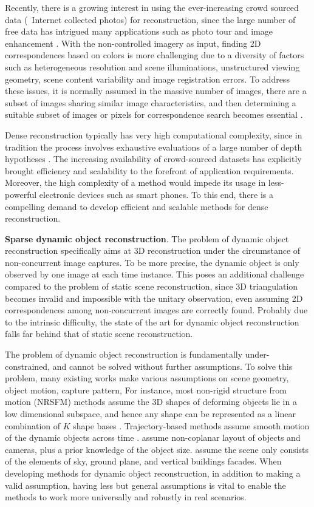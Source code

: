 Recently, there is a growing interest in using the ever-increasing crowd sourced data (\ie~Internet collected photos) for reconstruction, since the large number of free data has intrigued many applications such as photo tour \cite{Snavely2} and image enhancement \cite{zhang2014personal}. With the non-controlled imagery as input, finding 2D correspondences based on colors is more challenging due to a diversity of factors such as heterogeneous resolution and scene illuminations, unstructured viewing geometry, scene content variability and image registration errors. To address these issues, it is normally assumed in the massive number of images, there are a subset of images sharing similar image characteristics, and then 
determining a suitable subset of images or pixels for correspondence search becomes essential \cite{Goesele07}.

Dense reconstruction typically has very high computational complexity, since in tradition the process involves exhaustive evaluations of a large number of depth hypotheses \cite{yang2003multi}. The increasing availability of crowd-sourced datasets has explicitly brought efficiency and scalability to the forefront of application requirements.  Moreover, the high complexity of a method would impede its usage in less-powerful electronic devices such as smart phones. To this end, there is a compelling demand to develop efficient and scalable methods for dense reconstruction.

\textbf{Sparse dynamic object reconstruction}.
The problem of dynamic object reconstruction specifically aims at 3D reconstruction under the circumstance of non-concurrent image captures. To be more precise, the dynamic object is only observed by one image at each time instance. This poses an additional challenge compared to the problem of static  scene reconstruction, since 3D triangulation becomes invalid and impossible with the unitary observation, even assuming 2D correspondences among non-concurrent images are correctly found. Probably due to the intrinsic difficulty, the state of the art for dynamic object reconstruction falls far behind that of static scene reconstruction.

The problem of dynamic object reconstruction is fundamentally under-constrained, and cannot be solved without further assumptions. 
To solve this problem, many existing works make various assumptions on scene geometry, object motion, capture pattern, \etc
For instance, most non-rigid structure from motion (NRSFM) methods assume the 3D shapes of deforming objects lie in a low dimensional subspace, and hence any shape can be represented as a linear combination of $K$ shape bases \cite{Bregler_CVPR2000,torresani2008nonrigid,dai2014simple}. Trajectory-based methods assume smooth motion of the dynamic objects across time \cite{Akhter_NIPS08}. \citet{bao2011toward} assume non-coplanar layout of objects and cameras, plus a prior knowledge of the object size.  
\citet{Hoiem_CGRAPH2005} assume the scene only consists of the elements of sky, ground plane, and vertical buildings facades.
When developing methods for dynamic object reconstruction, in addition to making a valid assumption, having less but general assumptions is vital to enable the methods to work more universally and robustly in real scenarios. 

